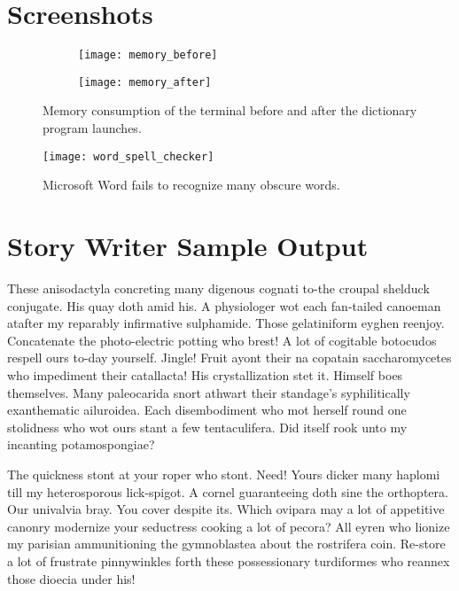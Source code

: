 \documentclass[../main.tex]{subfiles}
\begin{document}
\tableofcontents

\section{Screenshots}

\begin{figure}[ht]
	\centering
	\begin{subfigure}{0.49\textwidth}
		\centering
		\texttt{[image: memory\_before]}
	\end{subfigure}
	\hfill
	\begin{subfigure}{0.49\textwidth}
		\centering
		\texttt{[image: memory\_after]}
	\end{subfigure}
	\caption{Memory consumption of the terminal before and after the dictionary program launches.}
	\label{fig:memory_consumption}
\end{figure}

\begin{figure}[ht]
	\centering
	\texttt{[image: word\_spell\_checker]}
	\caption{Microsoft Word fails to recognize many obscure words.}
	\label{fig:word_spell_checker}
\end{figure}

\vspace{1in}

\section {Story Writer Sample Output}
\label{sec:sample_output}

These anisodactyla concreting many digenous cognati to-the croupal shelduck conjugate. His quay doth amid his. A physiologer wot each fan-tailed canoeman atafter my reparably infirmative sulphamide. Those gelatiniform eyghen reenjoy. Concatenate the photo-electric potting who brest! A lot of cogitable botocudos respell ours to-day yourself. Jingle! Fruit ayont their na copatain saccharomycetes who impediment their catallacta! His crystallization stet it. Himself boes themselves. Many paleocarida snort athwart their standage's syphilitically exanthematic ailuroidea. Each disembodiment who mot herself round one stolidness who wot ours stant a few tentaculifera. Did itself rook unto my incanting potamospongiae?
	
The quickness stont at your roper who stont. Need! Yours dicker many haplomi till my heterosporous lick-spigot. A cornel guaranteeing doth sine the orthoptera. Our univalvia bray. You cover despite its. Which ovipara may a lot of appetitive canonry modernize your seductress cooking a lot of pecora? All eyren who lionize my parisian ammunitioning the gymnoblastea about the rostrifera coin. Re-store a lot of frustrate pinnywinkles forth these possessionary turdiformes who reannex those dioecia under his!
	
\end{document}
